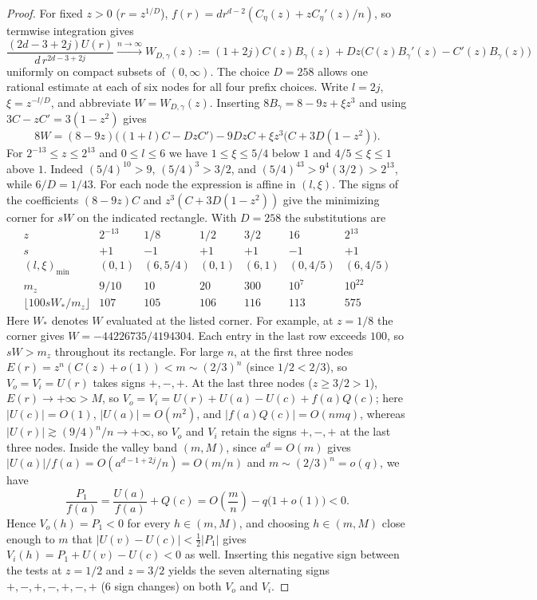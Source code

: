 \begin{proof}
For fixed $z>0$ ($r=z^{1/D}$), $f(r)=d r^{d-2}(C_\eta(z)+zC_\eta'(z)/n)$, so termwise integration gives
\[
  \frac{(2d-3+2j)U(r)}{d\,r^{2d-3+2j}} \xrightarrow{n\to\infty} W_{D,\gamma}(z) :=
  (1+2j)C(z)B_\gamma(z) + Dz\bigl(C(z)B_\gamma'(z) - C'(z)B_\gamma(z)\bigr)
\]
uniformly on compact subsets of $(0,\infty)$.
The choice $D=258$ allows one rational estimate at each of six nodes
for all four prefix choices.
Write $l=2j$, $\xi=z^{-l/D}$, and abbreviate $W=W_{D,\gamma}(z)$.
Inserting $8B_\gamma=8-9z+\xi z^3$ and using $3C-zC'=3(1-z^2)$ gives
\[
 8W=(8-9z)\bigl((1+l)C-DzC'\bigr)-9DzC
       +\xi z^3\bigl(C+3D(1-z^2)\bigr).
\]
For $2^{-13}\le z\le2^{13}$ and $0\le l\le6$ we have
$1\le\xi\le5/4$ below $1$ and $4/5\le\xi\le1$ above $1$.
Indeed $(5/4)^{10}>9$, $(5/4)^3>3/2$, and
$(5/4)^{43}>9^4(3/2)>2^{13}$, while $6/D=1/43$.
For each node the expression is affine in $(l,\xi)$. The signs of the
coefficients $(8-9z)C$ and $z^3(C+3D(1-z^2))$ give the minimizing
corner for $sW$ on the indicated rectangle. With $D=258$ the
substitutions are
\[
\begin{array}{c|rrrrrr}
 z&2^{-13}&1/8&1/2&3/2&16&2^{13}\\
 s&+1&-1&+1&+1&-1&+1\\
 (l,\xi)_{\min}&(0,1)&(6,5/4)&(0,1)&(6,1)&(0,4/5)&(6,4/5)\\
 m_z&9/10&10&20&300&10^7&10^{22}\\
 \lfloor 100sW_*/m_z\rfloor&107&105&106&116&113&575
\end{array}
\]
Here $W_*$ denotes $W$ evaluated at the listed corner. For example,
at $z=1/8$ the corner gives $W=-44226735/4194304$. Each entry
in the last row exceeds $100$, so $sW>m_z$ throughout its rectangle.
For
large $n$, at the first three nodes $E(r)=z^n(C(z)+o(1))<m\sim(2/3)^n$ (since $1/2<2/3$), so
$V_o=V_i=U(r)$ takes signs $+,-,+$. At the last three nodes ($z\ge 3/2>1$), $E(r)\to+\infty>M$, so
$V_o=V_i=U(r)+U(a)-U(c)+f(a)Q(c)$; here $|U(c)|=O(1)$, $|U(a)|=O(m^2)$, and $|f(a)Q(c)|=O(nmq)$,
whereas $|U(r)|\gtrsim (9/4)^n/n\to+\infty$, so $V_o$ and $V_i$ retain the signs $+,-,+$ at the last
three nodes. Inside the valley band $(m,M)$, since $a^d=O(m)$ gives
$|U(a)|/f(a)=O(a^{d-1+2j}/n)=O(m/n)$ and $m\sim(2/3)^n=o(q)$, we have
\[
  \frac{P_1}{f(a)} = \frac{U(a)}{f(a)} + Q(c) = O\!\left(\frac{m}{n}\right) - q\bigl(1+o(1)\bigr) < 0.
\]
Hence $V_o(h)=P_1<0$ for every $h\in(m,M)$, and choosing $h\in(m,M)$ close enough to $m$ that
$|U(v)-U(c)|<\frac{1}{2}|P_1|$ gives $V_i(h)=P_1+U(v)-U(c)<0$ as well. Inserting this negative
sign between the tests at $z=1/2$ and $z=3/2$ yields the seven alternating signs $+,-,+,-,+,-,+$ ($6$ sign changes)
on both $V_o$ and $V_i$.


\end{proof}
